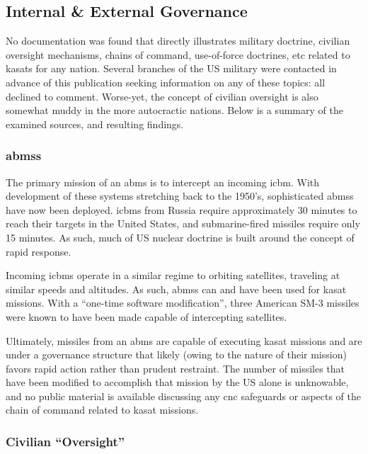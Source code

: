 \subsection{Internal \& External Governance}

No documentation was found that directly illustrates military
doctrine, civilian oversight mechanisms, chains of command,
use-of-force doctrines, etc related to \acp{kasat} for any nation.
Several branches of the US military were contacted in advance of this
publication seeking information on any of these topics: all declined
to comment.  Worse-yet, the concept of civilian oversight is also
somewhat muddy in the more autocractic nations.  Below is a summary of
the examined sources, and resulting findings.


\subsubsection{\acfp{abms}}

The primary mission of an \acf{abms} is to intercept an incoming
\ac{icbm}.  With development of these systems stretching back to the
1950's\cite[p01-10]{brian}, sophisticated \acp{abms} have now been
deployed.\cite[p01-15]{brian} \acp{icbm} from Russia require
approximately 30 minutes to reach their targets in the United States,
and submarine-fired missiles require only 15 minutes.\cite{cnc-primer}
As such, much of US nuclear doctrine is built around the concept of
rapid response.\cite{cnc-primer}

Incoming \acp{icbm} operate in a similar regime to orbiting
satellites, traveling at similar speeds and
altitudes.\cite[p01-15]{brian} As such, \acp{abms} can and have been
used for \ac{kasat} missions.  With a ``one-time software
modification'', three American SM-3 missiles were known to have been
made capable of intercepting satellites.\cite[p01-15]{brian}

Ultimately, missiles from an \ac{abms} are capable of executing
\ac{kasat} missions and are under a governance structure that likely
(owing to the nature of their mission) favors rapid action rather than
prudent restraint.  The number of missiles that have been modified to
accomplish that mission by the US alone is unknowable, and no public
material is available discussing any \ac{cnc} safeguards or aspects of
the chain of command related to \ac{kasat} missions.

\subsubsection{Civilian ``Oversight''}

